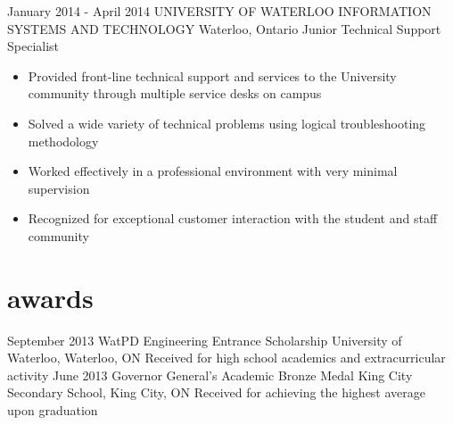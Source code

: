 \documentclass[hidelinks]{kkurucz-cv}
\begin{document}
\begin{entrylist}
\entry
{January 2014 - April 2014}
{UNIVERSITY OF WATERLOO INFORMATION SYSTEMS AND TECHNOLOGY}
{Waterloo, Ontario}
{Junior Technical Support Specialist}
{
\begin{itemize}
	\item Provided front-line technical support and services to the University community through multiple service desks on campus
	\item Solved a wide variety of technical problems using logical troubleshooting methodology
	\item Worked effectively in a professional environment with very minimal supervision
	\item Recognized for exceptional customer interaction with the student and staff community
\end{itemize}
}
\end{entrylist}

%


\section{awards}

\begin{entrylist}
\entry
{September 2013}
{WatPD Engineering Entrance Scholarship}
{University of Waterloo, Waterloo, ON}
{Received for high school academics and extracurricular activity}
{\null}
\entry
{June 2013}
{Governor General's Academic Bronze Medal}
{King City Secondary School, King City, ON}
{Received for achieving the highest average upon graduation}
{\null}
\end{entrylist}
\end{document}
